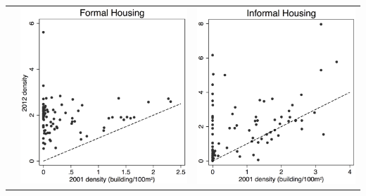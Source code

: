 \documentclass[aspectratio=149]{beamer}
\begin{document}
\begin{frame}
\begin{tabular}{rcc}
& \includegraphics[scale=0.14]{formal.png} & \includegraphics[scale=0.14]{informal.png}
\end{tabular}


\end{frame}
\end{document}
